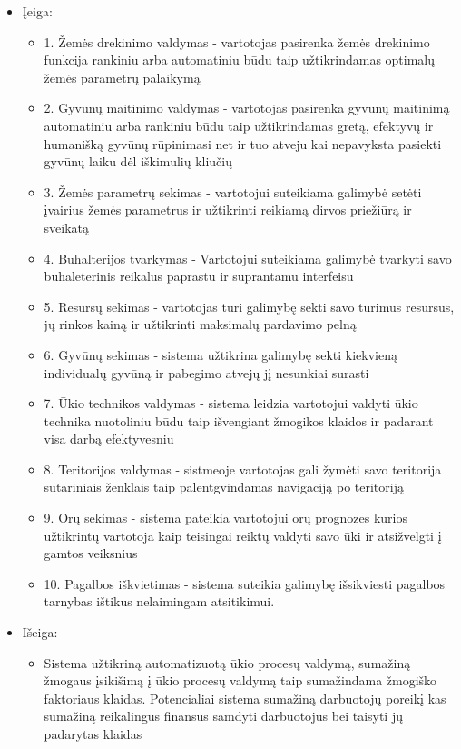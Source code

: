 \documentclass[oneside]{VUMIFPSkursinis}
\begin{document}
	\begin{itemize}
		\item{Įeiga: }
		\begin{itemize}
			\item{1. Žemės drekinimo valdymas - vartotojas pasirenka žemės drekinimo funkcija rankiniu arba automatiniu būdu taip užtikrindamas optimalų žemės parametrų palaikymą}
			\item{2. Gyvūnų maitinimo valdymas - vartotojas pasirenka gyvūnų maitinimą automatiniu arba rankiniu būdu taip užtikrindamas gretą, efektyvų ir humanišką gyvūnų rūpinimasi net ir tuo atveju kai nepavyksta pasiekti gyvūnų laiku dėl iškimulių kliučių}
			\item{3. Žemės parametrų sekimas - vartotojui suteikiama galimybė setėti įvairius žemės parametrus ir užtikrinti reikiamą dirvos priežiūrą ir sveikatą}
			\item{4. Buhalterijos tvarkymas - Vartotojui suteikiama galimybė tvarkyti savo buhaleterinis reikalus paprastu ir suprantamu interfeisu}
			\item{5. Resursų sekimas - vartotojas turi galimybę sekti savo turimus resursus, jų rinkos kainą ir užtikrinti maksimalų pardavimo pelną}
			\item{6. Gyvūnų sekimas - sistema užtikrina galimybę sekti kiekvieną individualų gyvūną ir pabegimo atvejų jį nesunkiai surasti}
			\item{7. Ūkio technikos valdymas - sistema leidzia vartotojui valdyti ūkio technika nuotoliniu būdu taip išvengiant žmogikos klaidos ir padarant visa darbą efektyvesniu}
			\item{8. Teritorijos valdymas - sistmeoje vartotojas gali žymėti savo teritorija sutariniais ženklais taip palentgvindamas navigaciją po teritoriją}
			\item{9. Orų sekimas - sistema pateikia vartotojui orų prognozes kurios užtikrintų vartotoja kaip teisingai reiktų valdyti savo ūki ir atsižvelgti į gamtos veiksnius}
			\item{10. Pagalbos iškvietimas - sistema suteikia galimybę išsikviesti pagalbos tarnybas ištikus nelaimingam atsitikimui.}
		\end{itemize}
		\item{Išeiga:}
		\begin{itemize}
			\item{Sistema užtikriną automatizuotą ūkio procesų valdymą, sumažiną žmogaus įsikišimą į ūkio procesų valdymą taip sumažindama žmogiško faktoriaus klaidas. Potencialiai sistema sumažiną darbuotojų poreikį kas sumažiną reikalingus finansus samdyti darbuotojus bei taisyti jų padarytas klaidas}

\end{itemize}
\end{itemize}
\end{document}
